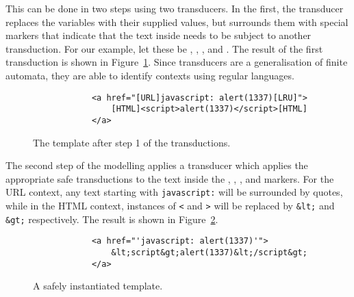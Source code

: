 This can be done in two steps using two transducers.
In the first, the transducer replaces the variables with their supplied values, but surrounds them with special markers that indicate that the text inside needs to be subject to another transduction.
For our example, let these be \urlstarttag, \urlendtag, \htmlstarttag, and \htmlendtag.
The result of the first transduction is shown in Figure~\ref{fig:closure-step-one}.
Since transducers are a generalisation of finite automata, they are able to identify contexts using regular languages.

\begin{figure}
    \begin{verbatim}
            <a href="[URL]javascript: alert(1337)[LRU]">
                [HTML]<script>alert(1337)</script>[HTML]
            </a>
    \end{verbatim}
    \caption{\label{fig:closure-step-one}The template after step 1 of the transductions.}
\end{figure}

The second step of the modelling applies a transducer which applies the appropriate safe transductions to the text inside the \urlstarttag, \urlendtag, \htmlstarttag, and \htmlendtag markers.
For the URL context, any text starting with \texttt{javascript:} will be surrounded by quotes, while in the HTML context, instances of \texttt{<} and \texttt{>} will be replaced by \texttt{\&lt;} and \texttt{\&gt;} respectively.
The result is shown in Figure~\ref{fig:closure-safe}.


\begin{figure}
    \begin{verbatim}
            <a href="'javascript: alert(1337)'">
                &lt;script&gt;alert(1337)&lt;/script&gt;
            </a>
    \end{verbatim}
    \caption{\label{fig:closure-safe}A safely instantiated template.}
\end{figure}


